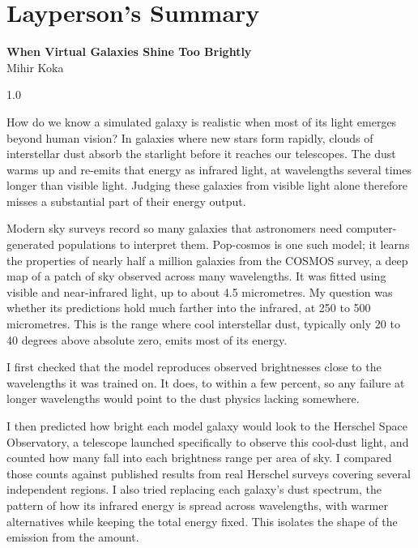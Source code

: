\documentclass[12pt,a4paper]{article}
\begin{document}
\section*{\centering Layperson's Summary}
\vspace{-0.3cm}
\begin{center}
{\normalsize\bfseries When Virtual Galaxies Shine Too Brightly}\\[2pt]
{\small Mihir Koka}
\end{center}
\begin{spacing}{1.0}

How do we know a simulated galaxy is realistic when most of its light emerges beyond
human vision? In galaxies where new stars form rapidly, clouds of interstellar
dust absorb the starlight before it reaches our telescopes. The dust warms up and
re-emits that energy as infrared light, at wavelengths several times
longer than visible light. Judging these galaxies from visible light alone therefore
misses a substantial part of their energy output.

Modern sky surveys record so many galaxies that astronomers need computer-generated
populations to interpret them. Pop-cosmos is one such model; it learns the
properties of nearly half a million galaxies from the COSMOS survey, a deep map of a
patch of sky observed across many wavelengths. It was fitted using visible and
near-infrared light, up to about 4.5 micrometres. My question was whether its
predictions hold much farther into the infrared, at 250 to 500 micrometres. This is
the range where cool interstellar dust, typically only 20 to 40 degrees above absolute
zero, emits most of its energy.

I first checked that the model reproduces observed brightnesses close to the
wavelengths it was trained on. It does, to within a few percent, so any failure at
longer wavelengths would point to the dust physics lacking somewhere.

I then predicted how bright each model galaxy would look to the Herschel Space
Observatory, a telescope launched specifically to observe this cool-dust light, and
counted how many fall into each brightness range per area of sky. I compared those
counts against published results from real Herschel surveys covering several
independent regions. I also tried replacing each galaxy's dust spectrum, the pattern of how its infrared
energy is spread across wavelengths, with warmer alternatives while keeping the total
energy fixed. This isolates the shape of the emission from the amount.


\end{spacing}
\end{document}
